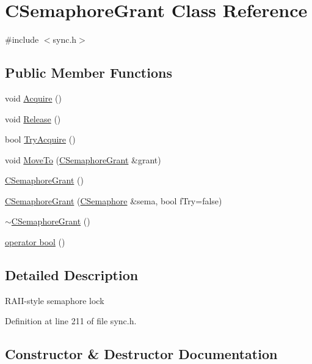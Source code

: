 \hypertarget{class_c_semaphore_grant}{}\section{C\+Semaphore\+Grant Class Reference}
\label{class_c_semaphore_grant}


{\ttfamily \#include $<$sync.\+h$>$}

\subsection*{Public Member Functions}
\begin{DoxyCompactItemize}
\item 
void \hyperlink{class_c_semaphore_grant_ac52976968379ea8e2470cfba877c3e89}{Acquire} ()
\item 
void \hyperlink{class_c_semaphore_grant_a8d985eeace74e037baeb39bd2d586576}{Release} ()
\item 
bool \hyperlink{class_c_semaphore_grant_a9952d9ea087ced803c099f69992ebb1d}{Try\+Acquire} ()
\item 
void \hyperlink{class_c_semaphore_grant_ab3e6f84f304703abc52517b0c8de26cf}{Move\+To} (\hyperlink{class_c_semaphore_grant}{C\+Semaphore\+Grant} \&grant)
\item 
\hyperlink{class_c_semaphore_grant_a84ca79a4c8519f1a69697c060cabc51d}{C\+Semaphore\+Grant} ()
\item 
\hyperlink{class_c_semaphore_grant_a5998c457c7c223a8257166161d12b355}{C\+Semaphore\+Grant} (\hyperlink{class_c_semaphore}{C\+Semaphore} \&sema, bool f\+Try=false)
\item 
\hyperlink{class_c_semaphore_grant_aaba5579eb3ad3647d79e71c9970dcb54}{$\sim$\+C\+Semaphore\+Grant} ()
\item 
\hyperlink{class_c_semaphore_grant_a91458b860e45949d87d770252e590a9b}{operator bool} ()
\end{DoxyCompactItemize}


\subsection{Detailed Description}
R\+A\+I\+I-\/style semaphore lock 

Definition at line 211 of file sync.\+h.



\subsection{Constructor \& Destructor Documentation}
\hypertarget{class_c_semaphore_grant_a84ca79a4c8519f1a69697c060cabc51d}{}
